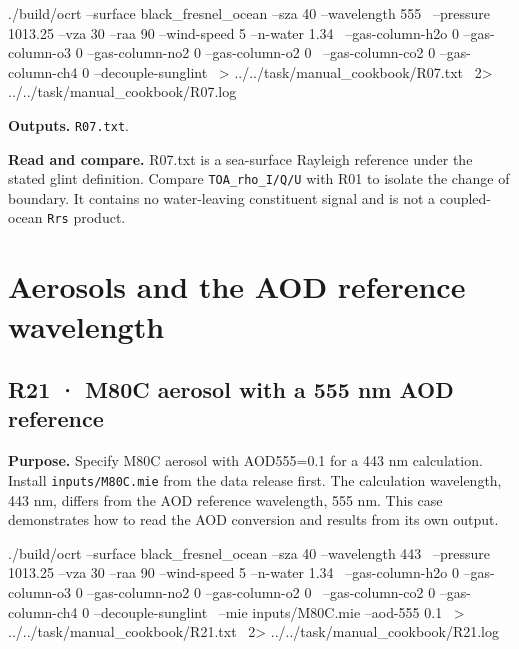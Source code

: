 \noindent\begin{minipage}{\linewidth}
\begin{ManualCode}

./build/ocrt --surface black_fresnel_ocean --sza 40 --wavelength 555 \
  --pressure 1013.25 --vza 30 --raa 90 --wind-speed 5 --n-water 1.34 \
  --gas-column-h2o 0 --gas-column-o3 0 --gas-column-no2 0 --gas-column-o2 0 \
  --gas-column-co2 0 --gas-column-ch4 0 --decouple-sunglint \
  > ../../task/manual_cookbook/R07.txt \
  2> ../../task/manual_cookbook/R07.log

\end{ManualCode}
\end{minipage}\par

\textbf{Outputs. }\texttt{R07.txt}.

\textbf{Read and compare. }R07.txt is a sea-surface Rayleigh reference under the stated glint definition. Compare \texttt{TOA\_\allowbreak{}rho\_\allowbreak{}I/\allowbreak{}Q/\allowbreak{}U} with R01 to isolate the change of boundary. It contains no water-leaving constituent signal and is not a coupled-ocean \texttt{Rrs} product.

\clearpage

\section{Aerosols and the AOD reference wavelength}

\label{sec:auto:09_cookbook:4}

\label{sec:cookbook_group:aerosol}

\subsection{R21 · M80C aerosol with a 555 nm AOD reference}
\label{sec:auto:09_cookbook:4.1}

\label{recipe:R21}

\textbf{Purpose. }Specify M80C aerosol with AOD555=0.1 for a 443 nm calculation. Install \texttt{inputs/\allowbreak{}M80C.mie} from the data release first. The calculation wavelength, 443 nm, differs from the AOD reference wavelength, 555 nm. This case demonstrates how to read the AOD conversion and results from its own output.

\noindent\begin{minipage}{\linewidth}
\begin{ManualCode}

./build/ocrt --surface black_fresnel_ocean --sza 40 --wavelength 443 \
  --pressure 1013.25 --vza 30 --raa 90 --wind-speed 5 --n-water 1.34 \
  --gas-column-h2o 0 --gas-column-o3 0 --gas-column-no2 0 --gas-column-o2 0 \
  --gas-column-co2 0 --gas-column-ch4 0 --decouple-sunglint \
  --mie inputs/M80C.mie --aod-555 0.1 \
  > ../../task/manual_cookbook/R21.txt \
  2> ../../task/manual_cookbook/R21.log

\end{ManualCode}
\end{minipage}\par

